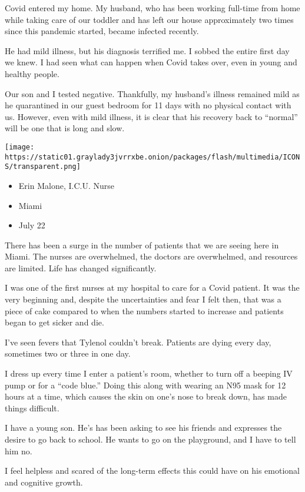 Covid entered my home. My husband, who has been working full-time from
home while taking care of our toddler and has left our house
approximately two times since this pandemic started, became infected
recently.

He had mild illness, but his diagnosis terrified me. I sobbed the entire
first day we knew. I had seen what can happen when Covid takes over,
even in young and healthy people.

Our son and I tested negative. Thankfully, my husband's illness remained
mild as he quarantined in our guest bedroom for 11 days with no physical
contact with us. However, even with mild illness, it is clear that his
recovery back to ``normal'' will be one that is long and slow.

\texttt{[image: https://static01.graylady3jvrrxbe.onion/packages/flash/multimedia/ICONS/transparent.png]}

\begin{itemize}
\tightlist
\item
  Erin Malone, I.C.U. Nurse
\item
  Miami
\item
  July 22
\end{itemize}

There has been a surge in the number of patients that we are seeing here
in Miami. The nurses are overwhelmed, the doctors are overwhelmed, and
resources are limited. Life has changed significantly.

I was one of the first nurses at my hospital to care for a Covid
patient. It was the very beginning and, despite the uncertainties and
fear I felt then, that was a piece of cake compared to when the numbers
started to increase and patients began to get sicker and die.

I've seen fevers that Tylenol couldn't break. Patients are dying every
day, sometimes two or three in one day.

I dress up every time I enter a patient's room, whether to turn off a
beeping IV pump or for a ``code blue.'' Doing this along with wearing an
N95 mask for 12 hours at a time, which causes the skin on one's nose to
break down, has made things difficult.

I have a young son. He's has been asking to see his friends and
expresses the desire to go back to school. He wants to go on the
playground, and I have to tell him no.

I feel helpless and scared of the long-term effects this could have on
his emotional and cognitive growth.

